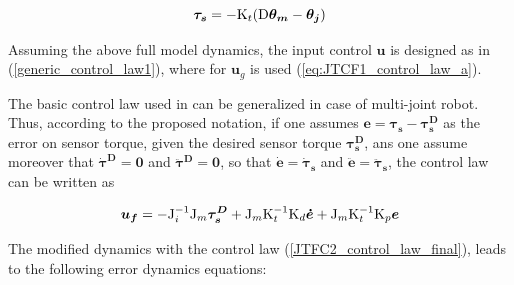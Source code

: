 \documentclass[journal]{IEEEtran}
\newcommand{\hl}[1]{\colorbox{yellow}{#1}}
\newcommand{\vectm}[1]{ { {\text #1} }}
\newcommand{\vects}[1]{{\boldsymbol {#1}}}
\begin{document}
\begin{equation}
\label{dynamic_model_modifiedHashimoto_3}
\vects{\tau_s} = -\vectm{K_t} (\vectm{D}\vects{{\theta}_m} - \vects{\theta_j})
\end{equation}


Assuming the above full model dynamics, the input control $\vects{u}$ is designed as in (\ref{generic_control_law1}), where for $\vects{u}_g$ is used (\ref{eq:JTCF1_control_law_a}).
%
%
%

The basic control law used in \cite{hashimoto1998experimental} can be generalized in case of multi-joint robot. Thus, according to the  proposed notation, if one assumes  $\vects{e}=\vects{\tau_s}-\vects{\tau_s^D}$ as the error on sensor torque, given the desired sensor torque  $\vects{\tau_s^D}$, ans one assume moreover that $\vects{\dot{\tau}^D}=\vects{0}$ and  $\vects{\ddot{\tau}^D}=\vects{0}$, so that 
$\vects{\dot{e}}=\vects{\dot{\tau}_s}$ and  $\vects{\ddot{e}}=\vects{\ddot{\tau}_s}$, the control law can be written as

\setlength{\arraycolsep}{0.0em}
\begin{equation}
\label{JTFC2_control_law_final}
\vects{u_f} = - \vectm{J^{-1}_i} \vectm{J_m} \vects{\tau^D_s} + \vectm{J_m} \vectm{K^{-1}_t} \vectm{K_d} \vects{\dot{e}} + \vectm{J_m} \vectm{K^{-1}_t} \vectm{K_p} \vects{e} 
\end{equation}
\setlength{\arraycolsep}{5pt}

The modified dynamics with the control law  (\ref{JTFC2_control_law_final}), leads to the following error dynamics equations:
\end{document}
